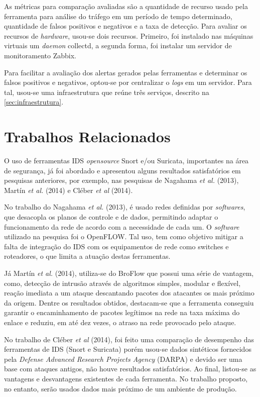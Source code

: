 As métricas para comparação avaliadas são a quantidade de recurso usado pela ferramenta para análise do tráfego em um período de tempo determinado, quantidade de falsos positivos e negativos e a taxa de detecção. Para avaliar os recursos de \textit{hardware}, usou-se dois recursos. Primeiro, foi instalado nas máquinas virtuais um \textit{daemon} collectd, a segunda forma, foi instalar um servidor de monitoramento Zabbix. 

Para facilitar a avaliação dos alertas gerados pelas ferramentas e determinar os falsos positivos e negativos, optou-se por centralizar o \textit{logs} em um servidor. Para tal, usou-se uma infraestrutura que reúne três serviços, descrito na \autoref{sec:infraestrutura}.

\section{Trabalhos Relacionados} \label{sec:trabalhos-relacionados}

O uso de ferramentas IDS \textit{opensource} Snort e/ou Suricata, importantes na área de segurança, já foi abordado e apresentou alguns resultados satisfatórios em pesquisas anteriores, por exemplo, nas pesquisas de Nagahama \textit{et al.} (2013), Martín \textit{et al.} (2014) e Cléber \textit{et al} (2014).

No trabalho do Nagahama \textit{et al.} (2013), é usado redes definidas por \textit{softwares}, que desacopla os planos de controle e de dados, permitindo adaptar o funcionamento da rede de acordo com a necessidade de cada um. O \textit{software} utilizado na pesquisa foi o OpenFLOW. Tal uso, tem como objetivo mitigar a falta de integração do IDS com os equipamentos de rede como {switches} e roteadores, o que limita a atuação destas ferramentas. 

Já Martín \textit{et al.} (2014), utiliza-se do BroFlow que possui uma série de vantagem, como, detecção de intrusão através de algoritmos simples, modular e flexível, reação imediata a um ataque descantando pacotes dos atacantes os mais próximo da origem. Dentre os resultados obtidos, destacam-se que a ferramenta conseguiu garantir o encaminhamento de pacotes legítimos na rede na taxa máxima do enlace e reduziu, em até dez vezes, o atraso na rede provocado pelo ataque.

No trabalho de Cléber \textit{et al} (2014), foi feito uma comparação de desempenho das ferramentas de IDS (Snort e Suricata) porém usou-se dados sintéticos fornecidos pela \textit{Defense Advanced Research Projects Agency} (DARPA) e devido ser uma base com ataques antigos, não houve resultados satisfatórios. Ao final, listou-se as vantagens e desvantagens existentes de cada ferramenta. No trabalho proposto, no entanto, serão usados dados mais próximo de um ambiente de produção. 

